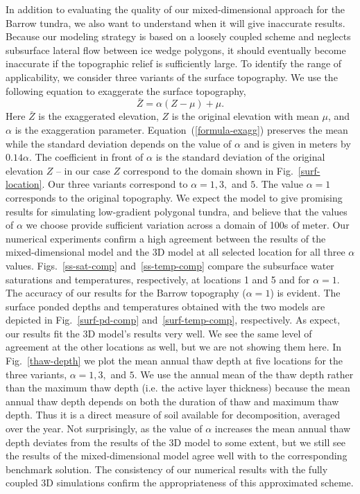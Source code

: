 \documentclass[review]{elsarticle}
\begin{document}
In addition to evaluating the quality of our mixed-dimensional approach for the Barrow tundra, we also want to understand when it will give inaccurate results. Because our modeling strategy is based on a loosely coupled scheme and neglects subsurface lateral flow between ice wedge polygons, it should eventually become inaccurate if the topographic relief is sufficiently large. To identify the range of applicability, we consider three variants of the surface topography.  We use the following equation to exaggerate the surface topography,
\begin{equation}\label{formula-exagg}
\bar{Z} =  \alpha (Z - \mu) + \mu.
\end{equation}
Here $\bar{Z}$ is the exaggerated elevation, $Z$ is the original elevation with mean $\mu$, and $\alpha$ is the exaggeration parameter. Equation~(\ref{formula-exagg})  preserves the mean while the standard deviation depends on the value of $\alpha$ and is given in meters by $0.14 \alpha$. The coefficient in front of $\alpha$ is the standard deviation of the original elevation $Z$ -- in our case $Z$ correspond to the domain shown in Fig.~\ref{surf-location}. Our three variants correspond to $\alpha=1,3,$ and $5$. The value $\alpha=1$ corresponds to the original topography. We expect the model to give promising results for simulating low-gradient polygonal tundra, and believe that the values of $\alpha$ we choose provide sufficient variation across a domain of 100s of meter. 
Our numerical experiments confirm a high agreement between the results of the mixed-dimensional model and the 3D model at all selected location for all three $\alpha$ values. Figs.~\ref{ss-sat-comp} and~\ref{ss-temp-comp} compare the subsurface water saturations and temperatures, respectively, at locations 1 and 5 and for $\alpha=1$. The accuracy of our results for the Barrow topography ($\alpha=1$) is evident. The surface ponded depths and temperatures obtained with the two models are depicted in Fig.~\ref{surf-pd-comp} and~\ref{surf-temp-comp}, respectively. As expect, our results fit the 3D model's results very well. We see the same level of agreement at the other locations as well, but we are not showing them here.
In Fig.~\ref{thaw-depth} we plot the mean annual thaw depth at five locations for the three variants, $\alpha =1, 3,$ and $5$. We use the annual mean of the thaw depth rather than the maximum thaw depth (i.e. the active layer thickness) because the mean annual thaw depth depends on both the duration of thaw and maximum thaw depth. Thus it is a direct measure of soil available for decomposition, averaged over the year. 
Not surprisingly, as the value of $\alpha$ increases the mean annual thaw depth deviates from the results of the 3D model to some extent, but we still see the results of the mixed-dimensional model agree well with to the corresponding benchmark solution. The consistency of our numerical results with the fully coupled 3D simulations confirm the appropriateness of this approximated scheme. 
\end{document}
